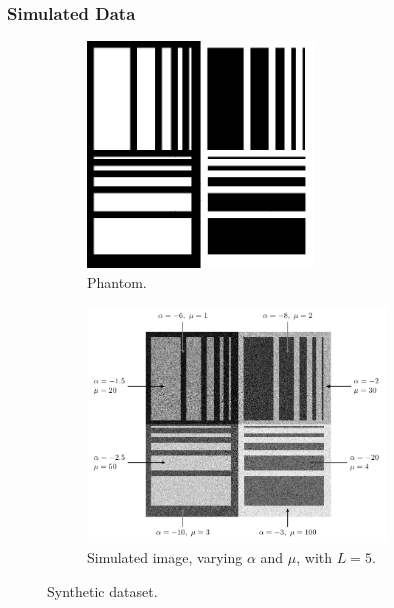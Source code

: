 \documentclass[aspectratio=1610,10pt]{beamer}
\begin{document}
\begin{frame} \frametitle{\large{Simulated Data }}\vspace{-0.1cm}

\begin{figure}[H]
  \centering
  \begin{subfigure}[b]{0.38\textwidth}
    \centering
    \includegraphics[width=60mm]{../../Figures/PNG/Phantom1}
    \caption{Phantom.}
    \label{fig:sim_Phantom_1}
  \end{subfigure}
  \hfill
  \begin{subfigure}[b]{0.57\textwidth}
    \centering
    \includegraphics[width=79mm]{../../Figures/PNG/Phantom_label/Phantom_labels}
    \caption{Simulated image, varying $\alpha$ and $\mu$, with $L=5$.}
    \label{fig:sim_Phantom_2}
  \end{subfigure}
  \caption{Synthetic dataset.}
  \label{fig:sim_Phantom}
\end{figure}
 
\end{frame} 
\end{document}
